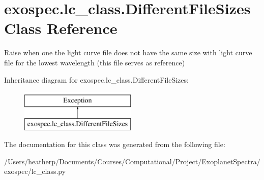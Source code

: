 \hypertarget{classexospec_1_1lc__class_1_1_different_file_sizes}{}\section{exospec.\+lc\+\_\+class.\+Different\+File\+Sizes Class Reference}
\label{classexospec_1_1lc__class_1_1_different_file_sizes}


Raise when one the light curve file does not have the same size with light curve file for the lowest wavelength (this file serves as reference)  


Inheritance diagram for exospec.\+lc\+\_\+class.\+Different\+File\+Sizes\+:\begin{figure}[H]
\begin{center}
\leavevmode
\includegraphics[height=2.000000cm]{classexospec_1_1lc__class_1_1_different_file_sizes}
\end{center}
\end{figure}


The documentation for this class was generated from the following file\+:\begin{DoxyCompactItemize}
\item 
/\+Users/heatherp/\+Documents/\+Courses/\+Computational/\+Project/\+Exoplanet\+Spectra/exospec/lc\+\_\+class.\+py\end{DoxyCompactItemize}
